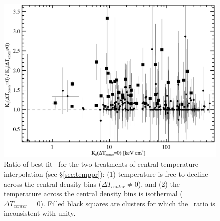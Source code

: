 \begin{figure}[htp]
  \begin{center}
    \begin{minipage}[htp]{0.9\linewidth}
      \includegraphics*[width=\textwidth, trim=5mm 0mm 5mm 5mm, clip]{itplflat_rat.eps}
      \caption{Ratio of best-fit \kna\ for the two treatments of
        central temperature interpolation (see \S\ref{sec:temppr}):
        (1) temperature is free to decline across the central density
        bins ($\Delta T_{center} \ne 0$), and (2) the temperature
        across the central density bins is isothermal ($\Delta
        T_{center} = 0$). Filled black squares are clusters for which
        the \kna\ ratio is inconsistent with unity.}
      \label{fig:kcomp}
    \end{minipage}
  \end{center}
\end{figure}
\clearpage
